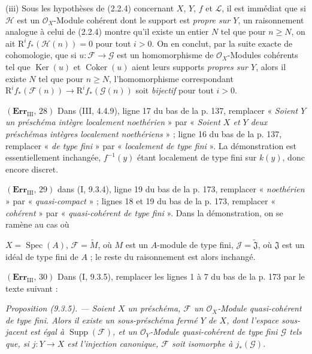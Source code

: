 (iii) Sous les hypothèses de (2.2.4) concernant $X$, $Y$, $f$ et $\mathscr L$,
il est immédiat que si $\mathscr H$ est un $\mathscr O_X$-Module cohérent dont
le support est \emph{propre sur $Y$}, un raisonnement analogue à celui de
(2.2.4) montre qu'il existe un entier $N$ tel que pour $n\geq N$, on ait
$\mathrm R^if_*(\mathscr H(n))=0$ pour tout $i>0$. On en conclut, par la suite
exacte de cohomologie, que si $u:\mathscr F\to\mathscr G$ est un homomorphisme
de $\mathscr O_X$-Modules cohérents tel que $\operatorname{Ker}(u)$ et
$\operatorname{Coker}(u)$ aient leurs supports \emph{propres sur $Y$}, alors il
existe $N$ tel que pour $n\geq N$, l'homomorphisme correspondant
$\mathrm R^if_*(\mathscr F(n))\to\mathrm R^if_*(\mathscr G(n))$ soit
\emph{bijectif} pour tout $i>0$.

\noindent\textbf{$(\mathbf{Err}_{\mathrm{III}},\,28)$} Dans (III, 4.4.9),
ligne 17 du bas de la p. 137, remplacer « \emph{Soient $Y$ un préschéma
intègre localement noethérien} » par « \emph{Soient $X$ et $Y$ deux
préschémas intègres localement noethériens} » ; ligne 16 du bas de la p.
137, remplacer « \emph{de type fini} » par « \emph{localement de type
fini} ». La démonstration est essentiellement inchangée,
$f^{-1}(y)$ étant localement de type fini sur $k(y)$, donc encore discret.

\noindent\textbf{$(\mathbf{Err}_{\mathrm{III}},\,29)$} dans (I, 9.3.4), ligne
19 du bas de la p. 173, remplacer « \emph{noethérien} » par
« \emph{quasi-compact} » ; lignes 18 et 19 du bas de la p. 173, remplacer
« \emph{cohérent} » par « \emph{quasi-cohérent de type fini} ». Dans la
démonstration, on se ramène au cas où

$X=\operatorname{Spec}(A)$, $\mathscr F=\widetilde M$, où $M$ est un $A$-module
de type fini, $\mathscr J=\widetilde{\mathfrak J}$, où $\mathfrak J$ est un
idéal de type fini de $A$ ; le reste du raisonnement est alors inchangé.

\noindent\textbf{$(\mathbf{Err}_{\mathrm{III}},\,30)$} Dans (I, 9.3.5),
remplacer les lignes 1 à 7 du bas de la p. 173 par le texte suivant :

\emph{Proposition (9.3.5). --- Soient $X$ un préschéma, $\mathscr F$ un
$\mathscr O_X$-Module quasi-cohérent de type fini. Alors il existe un
sous-préschéma fermé $Y$ de $X$, dont l'espace sous-jacent est égal à
$\operatorname{Supp}(\mathscr F)$, et un $\mathscr O_Y$-Module quasi-cohérent de
type fini $\mathscr G$ tels que, si $j:Y\to X$ est l'injection canonique,
$\mathscr F$ soit isomorphe à $j_*(\mathscr G)$.}

